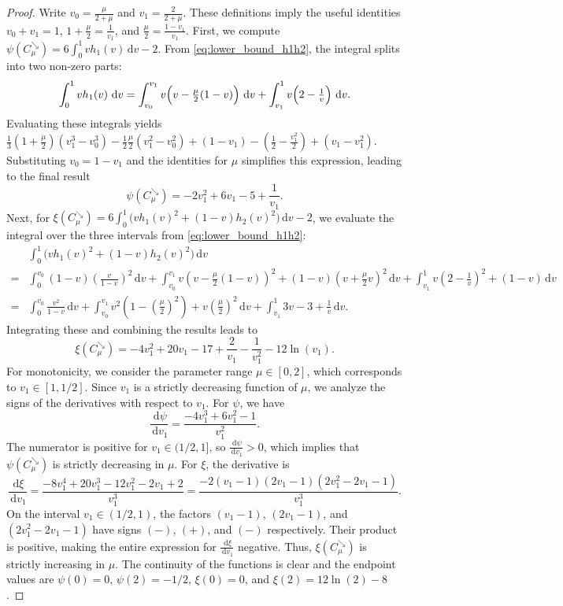\documentclass{article}
\newcommand{\1}{\mathds{1}}
\newcommand{\de}{\mathrm{\,d}}
\begin{document}
\begin{proof}
Write $v_0=\tfrac{\mu}{2+\mu}$ and $v_1=\tfrac{2}{2+\mu}$.
These definitions imply the useful identities $v_0+v_1=1$, $1+\tfrac{\mu}{2}=\tfrac{1}{v_1}$, and $\tfrac{\mu}{2}=\tfrac{1-v_1}{v_1}$.
First, we compute $\psi(C^{\searrow}_\mu)=6\int_0^1 v h_1(v)\de v-2$.
From \eqref{eq:lower_bound_h1h2}, the integral splits into two non-zero parts:
\[
\int_0^1 v h_1(v)\,\de v
= \int_{v_0}^{v_1}v\Bigl(v-\tfrac{\mu}{2}(1-v)\Bigr)\,\de v
+ \int_{v_1}^{1}v\Bigl(2-\tfrac{1}{v}\Bigr)\,\de v.
\]
Evaluating these integrals yields
\(
\frac{1}{3}(1+\tfrac{\mu}{2})(v_1^3-v_0^3) - \frac{1}{2}\tfrac{\mu}{2}(v_1^2-v_0^2) + (1-v_1) - (\tfrac{1}{2}-\tfrac{v_1^2}{2}) + (v_1-v_1^2).
\)
Substituting $v_0=1-v_1$ and the identities for $\mu$ simplifies this expression, leading to the final result
\[
\psi(C^{\searrow}_\mu)=-2v_1^2+6v_1-5+\frac{1}{v_1}.
\]
Next, for $\xi(C^{\searrow}_\mu) = 6\int_0^1 \bigl(v h_1(v)^2+(1-v)h_2(v)^2\bigr)\de v-2$, we evaluate the integral over the three intervals from \eqref{eq:lower_bound_h1h2}:
\small
\begin{align*}
&\int_0^1 \bigl(v h_1(v)^2+(1-v)h_2(v)^2\bigr)\de v \\
=& \int_0^{v_0} (1-v)\left(\frac{v}{1-v}\right)^2 \de v
+ \int_{v_0}^{v_1}v(v-\tfrac{\mu}{2}(1-v))^2+(1-v)\left(v+\tfrac{\mu}{2}v\right)^2 \de v
+ \int_{v_1}^{1}v\left(2-\tfrac{1}{v}\right)^2+(1-v) \de v \\
=& \int_0^{v_0} \frac{v^2}{1-v} \de v
+ \int_{v_0}^{v_1} v^2\left(1-\left(\tfrac{\mu}{2}\right)^2\right) + v\left(\tfrac{\mu}{2}\right)^2 \de v
+ \int_{v_1}^{1} 3v - 3 + \frac{1}{v} \de v.
\end{align*}
\normalsize
Integrating these and combining the results leads to
\[
\xi(C^{\searrow}_\mu)
=-4v_1^2+20v_1-17+\frac{2}{v_1}-\frac{1}{v_1^2}-12\ln(v_1).
\]
For monotonicity, we consider the parameter range $\mu \in [0,2]$, which corresponds to $v_1 \in [1, 1/2]$.
Since $v_1$ is a strictly decreasing function of $\mu$, we analyze the signs of the derivatives with respect to $v_1$.
For $\psi$, we have
\[
\frac{\de\psi}{\de v_1}=\frac{-4v_1^3+6v_1^2-1}{v_1^2}.
\]
The numerator is positive for $v_1 \in (1/2, 1]$, so $\frac{\de\psi}{\de v_1} > 0$, which implies that $\psi(C^{\searrow}_\mu)$ is strictly decreasing in $\mu$.
For $\xi$, the derivative is
\[
\frac{\de\xi}{\de v_1}
= \frac{-8v_1^4 + 20v_1^3 - 12v_1^2 - 2v_1 + 2}{v_1^3}
=\frac{-2(v_1-1)(2v_1-1)(2v_1^2-2v_1-1)}{v_1^3}.
\]
On the interval $v_1\in(1/2,1)$, the factors $(v_1-1)$, $(2v_1-1)$, and $(2v_1^2-2v_1-1)$ have signs $(-)$, $(+)$, and $(-)$ respectively.
Their product is positive, making the entire expression for $\frac{\de\xi}{\de v_1}$ negative.
Thus, $\xi(C^{\searrow}_\mu)$ is strictly increasing in $\mu$.
The continuity of the functions is clear and the endpoint values are $\psi(0)=0$, $\psi(2)=-1/2$, $\xi(0)=0$, and $\xi(2)=12\ln(2)-8$.
\end{proof}
\end{document}
